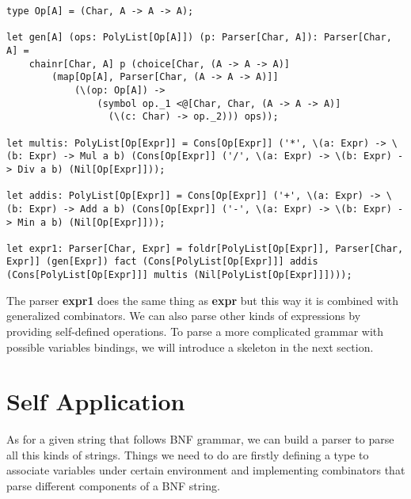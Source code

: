 \begin{lstlisting}
type Op[A] = (Char, A -> A -> A);

let gen[A] (ops: PolyList[Op[A]]) (p: Parser[Char, A]): Parser[Char, A] =
    chainr[Char, A] p (choice[Char, (A -> A -> A)] 
        (map[Op[A], Parser[Char, (A -> A -> A)]] 
            (\(op: Op[A]) -> 
                (symbol op._1 <@[Char, Char, (A -> A -> A)] 
                  (\(c: Char) -> op._2))) ops));
                  
let multis: PolyList[Op[Expr]] = Cons[Op[Expr]] ('*', \(a: Expr) -> \(b: Expr) -> Mul a b) (Cons[Op[Expr]] ('/', \(a: Expr) -> \(b: Expr) -> Div a b) (Nil[Op[Expr]]));

let addis: PolyList[Op[Expr]] = Cons[Op[Expr]] ('+', \(a: Expr) -> \(b: Expr) -> Add a b) (Cons[Op[Expr]] ('-', \(a: Expr) -> \(b: Expr) -> Min a b) (Nil[Op[Expr]]));

let expr1: Parser[Char, Expr] = foldr[PolyList[Op[Expr]], Parser[Char, Expr]] (gen[Expr]) fact (Cons[PolyList[Op[Expr]]] addis (Cons[PolyList[Op[Expr]]] multis (Nil[PolyList[Op[Expr]]])));
\end{lstlisting}
The parser \textbf{expr1} does the same thing as \textbf{expr} but this way it is combined with generalized combinators. We can also parse other kinds of expressions by providing self-defined operations. To parse a more complicated grammar with possible variables bindings, we will introduce a skeleton in the next section.

\section{Self Application}
As for a given string that follows BNF grammar, we can build a parser to parse all this kinds of strings. Things we need to do are firstly defining a type to associate variables under certain environment and implementing combinators that parse different components of a BNF string.


